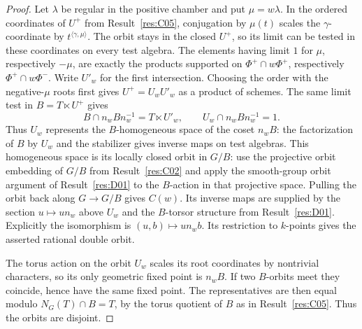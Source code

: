 \documentclass[11pt,a4paper,openany,oneside]{book}
\theoremstyle{resultstyle}
\theoremstyle{definition}
\numberwithin{equation}{chapter}
\begin{document}
\begin{proof}
Let \(\lambda\) be regular in the positive chamber and put
\(\mu=w\lambda\). In the ordered coordinates of \(U^+\) from
Result~\ref{res:C05}, conjugation by \(\mu(t)\) scales the
\(\gamma\)-coordinate by \(t^{\langle\gamma,\mu\rangle}\).
The orbit stays in the closed \(U^+\), so its limit can be
tested in these coordinates on every test algebra. The elements
having limit \(1\) for \(\mu\), respectively \(-\mu\),
are exactly the products supported on
\(\Phi^+\cap w\Phi^+\), respectively \(\Phi^+\cap w\Phi^-\).
Write \(U'_w\) for the first intersection.
Choosing the order with the negative-\(\mu\) roots first gives
\(U^+=U_w U'_w\) as a product of schemes.
The same limit test in \(B=T\ltimes U^+\) gives
\[
 B\cap n_w B n_w^{-1}=T\ltimes U'_w,\qquad
 U_w\cap n_w B n_w^{-1}=1.
\]
Thus \(U_w\) represents the \(B\)-homogeneous space of the
coset \(n_wB\): the factorization of \(B\) by \(U_w\) and
the stabilizer gives inverse maps on test algebras.
This homogeneous space is its locally closed orbit in \(G/B\):
use the projective orbit embedding of \(G/B\) from
Result~\ref{res:C02} and apply the smooth-group orbit argument
of Result~\ref{res:D01} to the \(B\)-action in that projective
space. Pulling the orbit back along \(G\to G/B\) gives
\(C(w)\). Its inverse maps are supplied by the section
\(u\mapsto un_w\) above \(U_w\) and the \(B\)-torsor structure
from Result~\ref{res:D01}. Explicitly the isomorphism is
\((u,b)\mapsto un_wb\). Its restriction to \(k\)-points
gives the asserted rational double orbit.

The torus action on the orbit \(U_w\) scales its root
coordinates by nontrivial characters, so its only geometric
fixed point is \(n_wB\). If two \(B\)-orbits meet they coincide,
hence have the same fixed point. The representatives are then
equal modulo \(N_G(T)\cap B=T\), by the torus quotient
of \(B\) as in Result~\ref{res:C05}. Thus the orbits are disjoint.


\end{proof}
\end{document}

